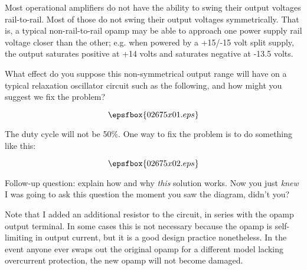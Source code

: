 

Most operational amplifiers do not have the ability to swing their output voltages rail-to-rail.  Most of those do not swing their output voltages symmetrically.  That is, a typical non-rail-to-rail opamp may be able to approach one power supply rail voltage closer than the other; e.g. when powered by a +15/-15 volt split supply, the output saturates positive at +14 volts and saturates negative at -13.5 volts.

What effect do you suppose this non-symmetrical output range will have on a typical relaxation oscillator circuit such as the following, and how might you suggest we fix the problem?

$$\epsfbox{02675x01.eps}$$







The duty cycle will not be 50\%.  One way to fix the problem is to do something like this:

$$\epsfbox{02675x02.eps}$$

\vskip 10pt

Follow-up question: explain how and why {\it this} solution works.  Now you just {\it knew} I was going to ask this question the moment you saw the diagram, didn't you?







Note that I added an additional resistor to the circuit, in series with the opamp output terminal.  In some cases this is not necessary because the opamp is self-limiting in output current, but it is a good design practice nonetheless.  In the event anyone ever swaps out the original opamp for a different model lacking overcurrent protection, the new opamp will not become damaged.




